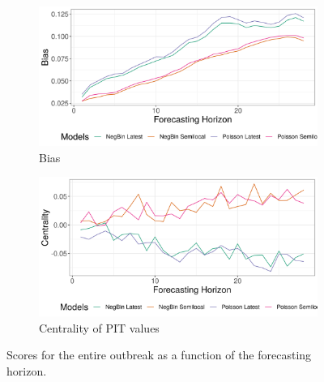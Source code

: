 \begin{figure}[H]
\begin{subfigure}{0.5\textwidth}
  \centering
  \includegraphics[width=\linewidth]{../output/Mambasa_bias.png}  
  \caption{Bias}
  \label{fig:sub-third}
\end{subfigure}
\begin{subfigure}{0.5\textwidth}
  \centering
  \includegraphics[width=\linewidth]{../output/Mambasa_centrality.png}  
  \caption{Centrality of PIT values}
  \label{fig:nat_scores_4}
\end{subfigure}
  \caption{Scores for the entire outbreak as a function of the forecasting horizon.}

  \label{fig:nat_scores}
\end{figure}
